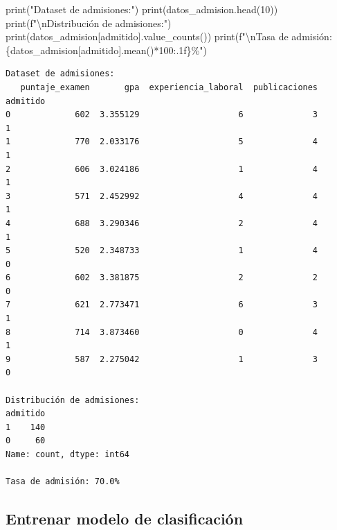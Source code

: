 \documentclass[
  doc,
  floatsintext,
  longtable,
  a4paper,
  nolmodern,
  notxfonts,
  notimes,
  12pt,
  colorlinks=true,linkcolor=blue,citecolor=blue,urlcolor=blue]{apa7}
\newenvironment{Shaded}{\begin{snugshade}}{\end{snugshade}}
\newcommand{\BuiltInTok}[1]{\textcolor[rgb]{0.00,0.23,0.31}{#1}}
\newcommand{\CharTok}[1]{\textcolor[rgb]{0.13,0.47,0.30}{#1}}
\newcommand{\DecValTok}[1]{\textcolor[rgb]{0.68,0.00,0.00}{#1}}
\newcommand{\NormalTok}[1]{\textcolor[rgb]{0.00,0.23,0.31}{#1}}
\newcommand{\OperatorTok}[1]{\textcolor[rgb]{0.37,0.37,0.37}{#1}}
\newcommand{\SpecialCharTok}[1]{\textcolor[rgb]{0.37,0.37,0.37}{#1}}
\newcommand{\SpecialStringTok}[1]{\textcolor[rgb]{0.13,0.47,0.30}{#1}}
\newcommand{\StringTok}[1]{\textcolor[rgb]{0.13,0.47,0.30}{#1}}
\begin{document}
\begin{Shaded}
\begin{Highlighting}[]
\BuiltInTok{print}\NormalTok{(}\StringTok{"Dataset de admisiones:"}\NormalTok{)}
\BuiltInTok{print}\NormalTok{(datos\_admision.head(}\DecValTok{10}\NormalTok{))}
\BuiltInTok{print}\NormalTok{(}\SpecialStringTok{f"}\CharTok{\textbackslash{}n}\SpecialStringTok{Distribución de admisiones:"}\NormalTok{)}
\BuiltInTok{print}\NormalTok{(datos\_admision[}\StringTok{\textquotesingle{}admitido\textquotesingle{}}\NormalTok{].value\_counts())}
\BuiltInTok{print}\NormalTok{(}\SpecialStringTok{f"}\CharTok{\textbackslash{}n}\SpecialStringTok{Tasa de admisión: }\SpecialCharTok{\{}\NormalTok{datos\_admision[}\StringTok{\textquotesingle{}admitido\textquotesingle{}}\NormalTok{]}\SpecialCharTok{.}\NormalTok{mean()}\OperatorTok{*}\DecValTok{100}\SpecialCharTok{:.1f\}}\SpecialStringTok{\%"}\NormalTok{)}
\end{Highlighting}
\end{Shaded}

\begin{verbatim}
Dataset de admisiones:
   puntaje_examen       gpa  experiencia_laboral  publicaciones  admitido
0             602  3.355129                    6              3         1
1             770  2.033176                    5              4         1
2             606  3.024186                    1              4         1
3             571  2.452992                    4              4         1
4             688  3.290346                    2              4         1
5             520  2.348733                    1              4         0
6             602  3.381875                    2              2         0
7             621  2.773471                    6              3         1
8             714  3.873460                    0              4         1
9             587  2.275042                    1              3         0

Distribución de admisiones:
admitido
1    140
0     60
Name: count, dtype: int64

Tasa de admisión: 70.0%
\end{verbatim}

\subsection{Entrenar modelo de
clasificación}\label{entrenar-modelo-de-clasificaciuxf3n}
\end{document}
